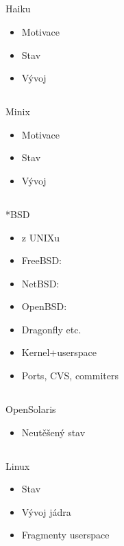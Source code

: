 \documentclass{beamer}
\begin{document}
\subsection{}
\begin{frame}{Haiku}
\begin{itemize}
\item Motivace
\item Stav
\item Vývoj
\end{itemize}
\end{frame}

\subsection{}
\begin{frame}{Minix}
\begin{itemize}
\item Motivace
\item Stav
\item Vývoj
\end{itemize}
\end{frame}

\subsection{}
\begin{frame}{*BSD}
\begin{itemize}
\item z UNIXu
\item FreeBSD:
\item NetBSD:
\item OpenBSD:
\item Dragonfly etc.
\item Kernel+userspace
\item Ports, CVS, commiters
\end{itemize}
\end{frame}

\subsection{}
\begin{frame}{OpenSolaris}
\begin{itemize}
\item Neutěšený stav
\end{itemize}
\end{frame}

\subsection{}
\begin{frame}{Linux}
\begin{itemize}
\item Stav
\item Vývoj jádra
\item Fragmenty userspace
\end{itemize}
\end{frame}
\end{document}
